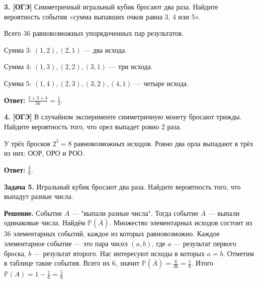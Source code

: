 \begin{task}\label{task-problems-3}
\textbf{3. [ОГЭ]} Симметричный игральный кубик бросают два раза. Найдите вероятность события «сумма выпавших очков равна 3, 4 или 5».
\end{task}

\begin{solution}\label{solution-equally-likely-outcomes-problems-3}
Всего 36 равновозможных упорядоченных пар результатов.

Сумма 3: $(1,2),(2,1)$ — два исхода.

Сумма 4: $(1,3),(2,2),(3,1)$ — три исхода.

Сумма 5: $(1,4),(2,3),(3,2),(4,1)$ — четыре исхода.

\textbf{Ответ:} $\frac{2+3+4}{36}=\frac14$.
\end{solution}

\begin{task}\label{task-problems-4}
\textbf{4. [ОГЭ]} В случайном эксперименте симметричную монету бросают трижды. Найдите вероятность того, что орел выпадет ровно 2 раза.
\end{task}

\begin{solution}\label{solution-equally-likely-outcomes-problems-4}
У трёх бросков $2^3=8$ равновозможных исходов. Ровно два орла выпадают в трёх из них: ООР, ОРО и РОО.

\textbf{Ответ:} $\frac38$.
\end{solution}

\begin{task}\label{task-problems-5}
\textbf{Задача 5.} Игральный кубик бросают два раза. Найдите вероятность того, что выпадут разные числа.
\end{task}

\begin{solution}\label{solution-equally-likely-outcomes-problems-5-method-1}
\textbf{Решение.} Событие $A$  —  "выпали разные числа". Тогда событие $\overline{A}$  —  выпали одинаковые числа. Найдём $\mathbb{P}(\overline{A})$. Множество элементарных исходов состоит из $36$ элементарных событий, каждое из которых равновозможно. Каждое элементарное событие  —  это пара чисел $(a,b)$, где $a$  —  результат первого броска, $b$  —  результат второго. Нас интересуют исходы в которых $a = b$. Отметим в таблице такие события. Всего их $6$, значит $\mathbb{P}(\overline{A}) = \frac{6}{36} = \frac{1}{6}$. Итого $\mathbb{P}(A) = 1 - \frac{1}{6} = \frac{5}{6}$

\end{solution}

